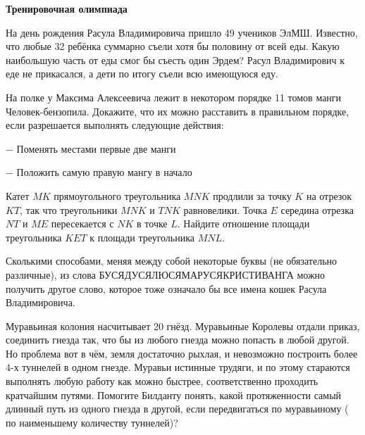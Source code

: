 \centerline{\bf \Huge Тренировочная олимпиада}

На день рождения Расула Владимировича пришло 49 учеников ЭлМШ. Известно, что любые 32 ребёнка суммарно съели хотя бы половину от всей еды. Какую наибольшую часть от еды смог бы съесть один Эрдем? Расул Владимирович к еде не прикасался, а дети по итогу съели всю имеющуюся еду.


На полке у Максима Алексеевича лежит в некотором порядке 11 томов манги Человек-бензопила. Докажите, что их можно расставить в правильном порядке, если разрешается выполнять следующие действия:

$-$ Поменять местами первые две манги

$-$ Положить самую правую мангу в начало


Катет $MK$ прямоугольного треугольника $MNK$ продлили за точку $K$ на отрезок $KT$, так что треугольники $MNK$ и $TNK$ равновелики. Точка $E$ середина отрезка $NT$ и $ME$ пересекается с $NK$ в точке $L$. Найдите отношение площади треугольника $KET$ к площади треугольника $MNL$.


Сколькими способами, меняя между собой некоторые буквы (не обязательно различные), из слова БУСЯДУСЯЛЮСЯМАРУСЯКРИСТИВАНГА можно получить другое слово, которое тоже означало бы все имена кошек Расула Владимировича.


Муравьиная колония насчитывает 20 гнёзд. Муравьиные Королевы отдали приказ, соединить гнезда так, что бы из любого гнезда можно попасть в любой другой. Но проблема вот в чём, земля достаточно рыхлая, и невозможно построить более 4-х туннелей в одном гнезде. Муравьи истинные трудяги, и по этому стараются выполнять любую работу как можно быстрее, соответственно проходить кратчайшим путями. Помогите Билданту понять, какой протяженности самый длинный путь из одного гнезда в другой, если передвигаться по муравьиному ( по наименьшему количеству туннелей)?

